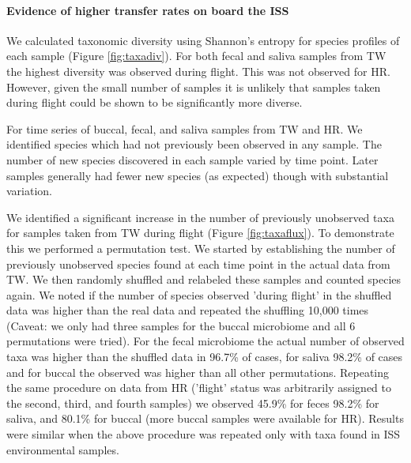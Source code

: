 \paragraph{Evidence of higher transfer rates on board the ISS}

We calculated taxonomic diversity using Shannon's entropy for species profiles of each sample (Figure \ref{fig:taxadiv}). For both fecal and saliva samples from TW the highest diversity was observed during flight. This was not observed for HR. However, given the small number of samples it is unlikely that samples taken during flight could be shown to be significantly more diverse.


 For time series of buccal, fecal, and saliva samples from TW and HR. We identified species which had not previously been observed in any sample. The number of new species discovered in each sample varied by time point. Later samples generally had fewer new species (as expected) though with substantial variation.

We identified a significant increase in the number of previously unobserved taxa for samples taken from TW during flight (Figure \ref{fig:taxaflux}). To demonstrate this we performed a permutation test. We started by establishing the number of previously unobserved species found at each time point in the actual data from TW. We then randomly shuffled and relabeled these samples and counted species again. We noted if the number of species observed 'during flight' in the shuffled data was higher than the real data and repeated the shuffling 10,000 times (Caveat: we only had three samples for the buccal microbiome and all 6 permutations were tried). For the fecal microbiome the actual number of observed taxa was higher than the shuffled data in 96.7\% of cases, for saliva 98.2\% of cases and for buccal the observed was higher than all other permutations. Repeating the same procedure on data from HR ('flight' status was arbitrarily assigned to the second, third, and fourth samples)  we observed 45.9\% for feces 98.2\% for saliva, and 80.1\% for buccal (more buccal samples were available for HR). Results were similar when the above procedure was repeated only with taxa found in ISS environmental samples.

